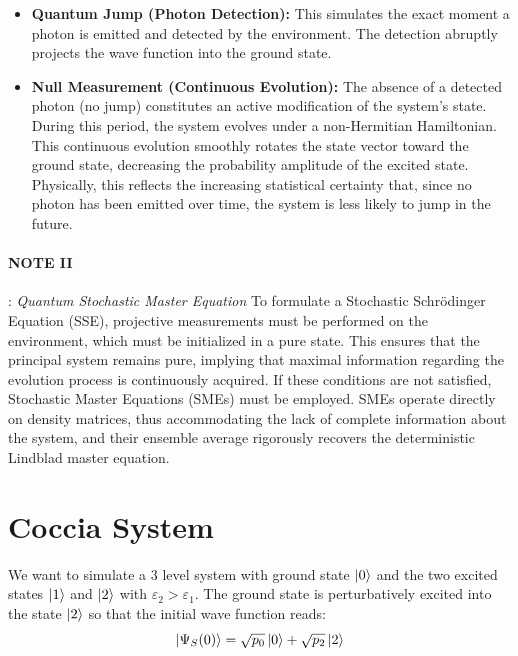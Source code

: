 \documentclass[a4paper,12pt]{article}
\begin{document}
	\begin{itemize}
		\item \textbf{Quantum Jump (Photon Detection):} This simulates the exact moment a photon is emitted and detected by the environment. The detection abruptly projects the wave function into the ground state.
		\item \textbf{Null Measurement (Continuous Evolution):} The absence of a detected photon (no jump) constitutes an active modification of the system's state. During this period, the system evolves under a non-Hermitian Hamiltonian. This continuous evolution smoothly rotates the state vector toward the ground state, decreasing the probability amplitude of the excited state. Physically, this reflects the increasing statistical certainty that, since no photon has been emitted over time, the system is less likely to jump in the future.
	\end{itemize} 
	
	\paragraph{NOTE II}:\textit{ Quantum Stochastic Master Equation} \newline
	To formulate a Stochastic Schrödinger Equation (SSE), projective measurements must be performed on the environment, which must be initialized in a pure state. This ensures that the principal system remains pure, implying that maximal information regarding the evolution process is continuously acquired. If these conditions are not satisfied, Stochastic Master Equations (SMEs) must be employed. SMEs operate directly on density matrices, thus accommodating the lack of complete information about the system, and their ensemble average rigorously recovers the deterministic Lindblad master equation.
	
	\newpage
	
	\section{Coccia System}
	We want to simulate a 3 level system with ground state $ \ket{0} $ and the two excited states $ \ket{1} $ and $ \ket{2} $ with $ \varepsilon_2 > \varepsilon_1 $. The ground state is perturbatively excited into the state $ \ket{2} $ so that the initial wave function reads:
	\begin{equation}
		\ket{\Psi_{S} (0)} = \sqrt{p_{0}} \ket{0} + \sqrt{p_{2}} \ket{2}
	\end{equation}
	
\end{document}
